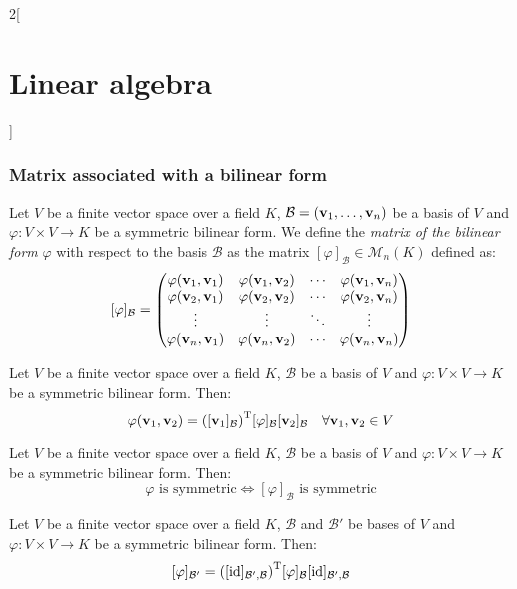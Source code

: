 \documentclass[../../../main.tex]{subfiles}
\begin{document}
\begin{multicols}{2}[\section{Linear algebra}]
  \subsubsection{Matrix associated with a bilinear form}
  \begin{definition}
    Let $V$ be a finite vector space over a field $K$, $\mathcal{B}=(\boldsymbol{\mathrm{v}}_1,\ldots,\boldsymbol{\mathrm{v}}_n)$ be a basis of $V$ and $\varphi:V\times V\rightarrow K$ be a symmetric bilinear form. We define the \emph{matrix of the bilinear form} $\varphi$ with respect to the basis $\mathcal{B}$ as the matrix $[\varphi]_\mathcal{B}\in\mathcal{M}_n(K)$ defined as: $$[\varphi]_\mathcal{B}=
      \begin{pmatrix}
        \varphi(\boldsymbol{\mathrm{v}}_1,\boldsymbol{\mathrm{v}}_1) & \varphi(\boldsymbol{\mathrm{v}}_1,\boldsymbol{\mathrm{v}}_2) & \cdots & \varphi(\boldsymbol{\mathrm{v}}_1,\boldsymbol{\mathrm{v}}_n) \\
        \varphi(\boldsymbol{\mathrm{v}}_2,\boldsymbol{\mathrm{v}}_1) & \varphi(\boldsymbol{\mathrm{v}}_2,\boldsymbol{\mathrm{v}}_2) & \cdots & \varphi(\boldsymbol{\mathrm{v}}_2,\boldsymbol{\mathrm{v}}_n) \\
        \vdots                     & \vdots                     & \ddots & \vdots                     \\
        \varphi(\boldsymbol{\mathrm{v}}_n,\boldsymbol{\mathrm{v}}_1) & \varphi(\boldsymbol{\mathrm{v}}_n,\boldsymbol{\mathrm{v}}_2) & \cdots & \varphi(\boldsymbol{\mathrm{v}}_n,\boldsymbol{\mathrm{v}}_n) \\
      \end{pmatrix}$$
  \end{definition}
  \begin{lemma}
    Let $V$ be a finite vector space over a field $K$, $\mathcal{B}$ be a basis of $V$ and $\varphi:V\times V\rightarrow K$ be a symmetric bilinear form. Then:
    $$\varphi(\boldsymbol{\mathrm{v}}_1,\boldsymbol{\mathrm{v}}_2)={\left([\boldsymbol{\mathrm{v}}_1]_\mathcal{B}\right)}^\mathrm{T}[\varphi]_\mathcal{B}[\boldsymbol{\mathrm{v}}_2]_\mathcal{B}\quad\forall\boldsymbol{\mathrm{v}}_1,\boldsymbol{\mathrm{v}}_2\in V$$
  \end{lemma}
  \begin{proposition}
    Let $V$ be a finite vector space over a field $K$, $\mathcal{B}$ be a basis of $V$ and $\varphi:V\times V\rightarrow K$ be a symmetric bilinear form. Then: $$\varphi\text{ is symmetric}\iff[\varphi]_\mathcal{B}\text{ is symmetric}$$
  \end{proposition}
  \begin{proposition}
    Let $V$ be a finite vector space over a field $K$, $\mathcal{B}$ and $\mathcal{B}'$ be bases of $V$ and $\varphi:V\times V\rightarrow K$ be a symmetric bilinear form. Then: $$[\varphi]_{\mathcal{B}'}={([\mathrm{id}]_{\mathcal{B}',\mathcal{B}})}^\mathrm{T}[\varphi]_\mathcal{B}[\mathrm{id}]_{\mathcal{B}',\mathcal{B}}$$
  \end{proposition}

\end{multicols}
\end{document}
